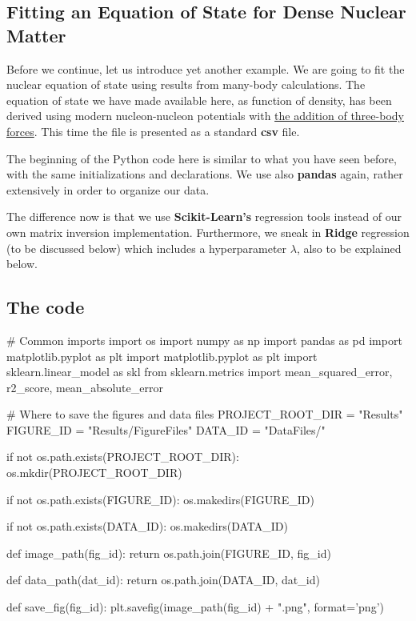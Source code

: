 \documentclass[%
oneside,                 %
final,                   %
10pt]{article}
\begin{document}
\subsection{Fitting an Equation of State for Dense Nuclear Matter}

Before we continue, let us introduce yet another example. We are going to fit the
nuclear equation of state using results from many-body calculations.
The equation of state we have made available here, as function of
density, has been derived using modern nucleon-nucleon potentials with
\href{{https://www.sciencedirect.com/science/article/pii/S0370157399001106}}{the addition of three-body
forces}. This
time the file is presented as a standard \textbf{csv} file.

The beginning of the Python code here is similar to what you have seen before,
with the same initializations and declarations. We use also \textbf{pandas}
again, rather extensively in order to organize our data.

The difference now is that we use \textbf{Scikit-Learn's} regression tools
instead of our own matrix inversion implementation. Furthermore, we
sneak in \textbf{Ridge} regression (to be discussed below) which includes a
hyperparameter $\lambda$, also to be explained below.

\subsection{The code}

\bpycod
# Common imports
import os
import numpy as np
import pandas as pd
import matplotlib.pyplot as plt
import matplotlib.pyplot as plt
import sklearn.linear_model as skl
from sklearn.metrics import mean_squared_error, r2_score, mean_absolute_error

# Where to save the figures and data files
PROJECT_ROOT_DIR = "Results"
FIGURE_ID = "Results/FigureFiles"
DATA_ID = "DataFiles/"

if not os.path.exists(PROJECT_ROOT_DIR):
    os.mkdir(PROJECT_ROOT_DIR)

if not os.path.exists(FIGURE_ID):
    os.makedirs(FIGURE_ID)

if not os.path.exists(DATA_ID):
    os.makedirs(DATA_ID)

def image_path(fig_id):
    return os.path.join(FIGURE_ID, fig_id)

def data_path(dat_id):
    return os.path.join(DATA_ID, dat_id)

def save_fig(fig_id):
    plt.savefig(image_path(fig_id) + ".png", format='png')
\end{document}
